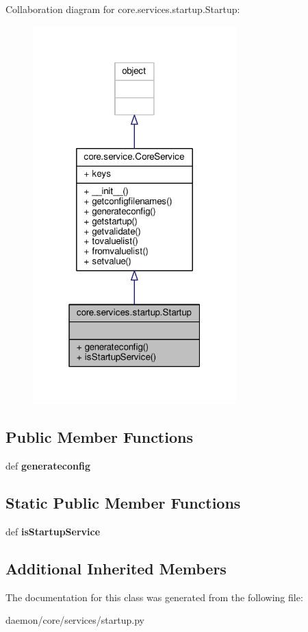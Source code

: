 Collaboration diagram for core.\+services.\+startup.\+Startup\+:
\nopagebreak
\begin{figure}[H]
\begin{center}
\leavevmode
\includegraphics[width=223pt]{classcore_1_1services_1_1startup_1_1_startup__coll__graph}
\end{center}
\end{figure}
\subsection*{Public Member Functions}
\begin{DoxyCompactItemize}
\item 
\hypertarget{classcore_1_1services_1_1startup_1_1_startup_a90520f4de7698eabeb1e179a965a32e4}{def {\bfseries generateconfig}}\label{classcore_1_1services_1_1startup_1_1_startup_a90520f4de7698eabeb1e179a965a32e4}

\end{DoxyCompactItemize}
\subsection*{Static Public Member Functions}
\begin{DoxyCompactItemize}
\item 
\hypertarget{classcore_1_1services_1_1startup_1_1_startup_a16cb6b4fde076e69d90b8059afcb8d76}{def {\bfseries is\+Startup\+Service}}\label{classcore_1_1services_1_1startup_1_1_startup_a16cb6b4fde076e69d90b8059afcb8d76}

\end{DoxyCompactItemize}
\subsection*{Additional Inherited Members}


The documentation for this class was generated from the following file\+:\begin{DoxyCompactItemize}
\item 
daemon/core/services/startup.\+py\end{DoxyCompactItemize}
